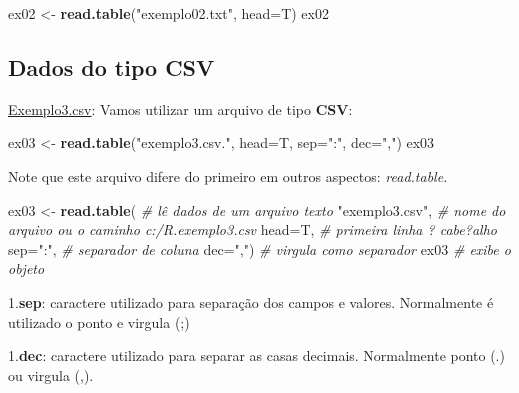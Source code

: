 \documentclass[
]{book}
\newenvironment{Shaded}{\begin{snugshade}}{\end{snugshade}}
\newcommand{\CommentTok}[1]{\textcolor[rgb]{0.56,0.35,0.01}{\textit{#1}}}
\newcommand{\DataTypeTok}[1]{\textcolor[rgb]{0.13,0.29,0.53}{#1}}
\newcommand{\KeywordTok}[1]{\textcolor[rgb]{0.13,0.29,0.53}{\textbf{#1}}}
\newcommand{\NormalTok}[1]{#1}
\newcommand{\StringTok}[1]{\textcolor[rgb]{0.31,0.60,0.02}{#1}}
\begin{document}
\begin{Shaded}
\begin{Highlighting}[]
\NormalTok{ex02 <-}\StringTok{ }\KeywordTok{read.table}\NormalTok{(}\StringTok{"exemplo02.txt"}\NormalTok{, }\DataTypeTok{head=}\NormalTok{T) }
\NormalTok{ex02}
\end{Highlighting}
\end{Shaded}

\hypertarget{dados-do-tipo-csv}{%
\subsection{Dados do tipo CSV}\label{dados-do-tipo-csv}}

\href{https://www.dropbox.com/s/mv13cmkysw2nizm/exemplo3.csv?dl=1}{Exemplo3.csv}: Vamos utilizar um arquivo de tipo \textbf{CSV}:

\begin{Shaded}
\begin{Highlighting}[]
\NormalTok{ex03 <-}\StringTok{ }\KeywordTok{read.table}\NormalTok{(}\StringTok{"exemplo3.csv."}\NormalTok{, }\DataTypeTok{head=}\NormalTok{T, }\DataTypeTok{sep=}\StringTok{":"}\NormalTok{, }\DataTypeTok{dec=}\StringTok{","}\NormalTok{) }
\NormalTok{ex03}
\end{Highlighting}
\end{Shaded}

Note que este arquivo difere do primeiro em outros aspectos:
\emph{read.table.}

\begin{Shaded}
\begin{Highlighting}[]
\NormalTok{ex03 <-}\StringTok{ }\KeywordTok{read.table}\NormalTok{(       }\CommentTok{# lê dados de um arquivo texto}
  \StringTok{"exemplo3.csv"}\NormalTok{,         }\CommentTok{# nome do arquivo ou o caminho c:/R.exemplo3.csv}
  \DataTypeTok{head=}\NormalTok{T,                 }\CommentTok{# primeira linha ? cabe?alho}
  \DataTypeTok{sep=}\StringTok{":"}\NormalTok{,                }\CommentTok{# separador de coluna }
  \DataTypeTok{dec=}\StringTok{","}\NormalTok{)                }\CommentTok{# virgula como separador}
\NormalTok{ex03                      }\CommentTok{# exibe o objeto}
\end{Highlighting}
\end{Shaded}

1.\textbf{sep}: caractere utilizado para separação dos campos e valores. Normalmente é utilizado o ponto e virgula (;)

1.\textbf{dec}: caractere utilizado para separar as casas decimais. Normalmente ponto (.) ou virgula (,).
\end{document}
